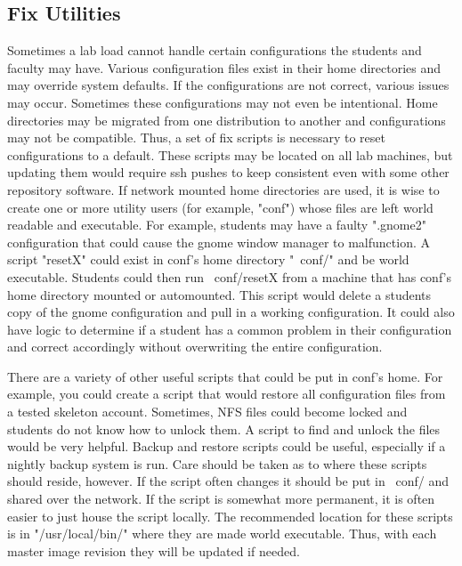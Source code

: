 \subsection{Fix Utilities}
Sometimes a lab load cannot handle certain configurations the students and faculty may have.  Various configuration files exist in their home directories and may override system defaults.  If the configurations are not correct, various issues may occur.  Sometimes these configurations may not even be intentional.  Home directories may be migrated from one distribution to another and configurations may not be compatible.  Thus, a set of fix scripts is necessary to reset configurations to a default.  These scripts may be located on all lab machines, but updating them would require ssh pushes to keep consistent even with some other repository software.  If network mounted home directories are used, it is wise to create one or more utility users (for example, "conf") whose files are left world readable and executable.  For example, students may have a faulty ".gnome2" configuration that could cause the gnome window manager to malfunction.  A script "resetX" could exist in conf's home directory "~conf/" and be world executable.  Students could then run ~conf/resetX from a machine that has conf's home directory mounted or automounted.  This script would delete a students copy of the gnome configuration and pull in a working configuration.  It could also have logic to determine if a student has a common problem in their configuration and correct accordingly without overwriting the entire configuration.   

There are a variety of other useful scripts that could be put in conf's home.  For example, you could create a script that would restore all configuration files from a tested skeleton account.  Sometimes, NFS files could become locked and students do not know how to unlock them.  A script to find and unlock the files would be very helpful.  Backup and restore scripts could be useful, especially if a nightly backup system is run.  Care should be taken as to where these scripts should reside, however.  If the script often changes it should be put in ~conf/ and shared over the network.  If the script is somewhat more permanent, it is often easier to just house the script locally.  The recommended location for these scripts is in "/usr/local/bin/" where they are made world executable.  Thus, with each master image revision they will be updated if needed.  
